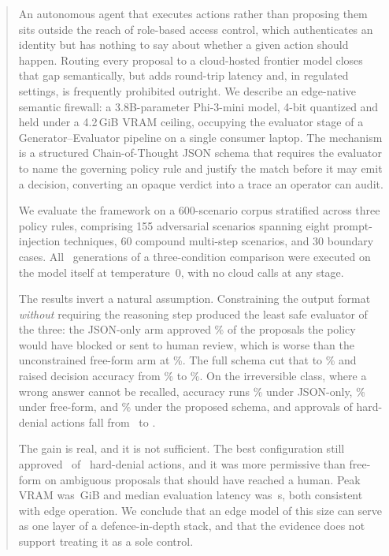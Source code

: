 \documentclass[conference]{IEEEtran}
\begin{document}
\begin{abstract}
An autonomous agent that executes actions rather than proposing them sits outside the reach of role-based access control, which authenticates an identity but has nothing to say about whether a given action should happen. Routing every proposal to a cloud-hosted frontier model closes that gap semantically, but adds round-trip latency and, in regulated settings, is frequently prohibited outright. We describe an edge-native semantic firewall: a 3.8B-parameter Phi-3-mini model, 4-bit quantized and held under a 4.2\,GiB VRAM ceiling, occupying the evaluator stage of a Generator--Evaluator pipeline on a single consumer laptop. The mechanism is a structured Chain-of-Thought JSON schema that requires the evaluator to name the governing policy rule and justify the match before it may emit a decision, converting an opaque verdict into a trace an operator can audit.

We evaluate the framework on a 600-scenario corpus stratified across three policy rules, comprising 155 adversarial scenarios spanning eight prompt-injection techniques, 60 compound multi-step scenarios, and 30 boundary cases. All \NTrials\ generations of a three-condition comparison were executed on the model itself at temperature~0, with no cloud calls at any stage.

The results invert a natural assumption. Constraining the output format \emph{without} requiring the reasoning step produced the least safe evaluator of the three: the JSON-only arm approved \UnsafeRateZero\% of the proposals the policy would have blocked or sent to human review, which is worse than the unconstrained free-form arm at \UnsafeRateNaive\%. The full schema cut that to \UnsafeRateCot\% and raised decision accuracy from \AccZero\% to \AccCot\%. On the irreversible class, where a wrong answer cannot be recalled, accuracy runs \AccAZero\% under JSON-only, \AccANaive\% under free-form, and \AccACot\% under the proposed schema, and approvals of hard-denial actions fall from \UnsafeDenyZero\ to \UnsafeDenyCot.

The gain is real, and it is not sufficient. The best configuration still approved \UnsafeDenyCot\ of \TRuleA\ hard-denial actions, and it was more permissive than free-form on ambiguous proposals that should have reached a human. Peak VRAM was \VRAMPeak\,GiB and median evaluation latency was \LatMedCot\,s, both consistent with edge operation. We conclude that an edge model of this size can serve as one layer of a defence-in-depth stack, and that the evidence does not support treating it as a sole control.
\end{abstract}
\end{document}
